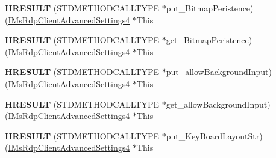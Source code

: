 \begin{DoxyCompactItemize}
\item 
\mbox{\label{struct_m_s_t_s_c_lib_1_1_i_ms_rdp_client_advanced_settings4_vtbl_a35eb2526465e976b9559883c106508df}} 
{\bfseries H\+R\+E\+S\+U\+LT} (S\+T\+D\+M\+E\+T\+H\+O\+D\+C\+A\+L\+L\+T\+Y\+PE $\ast$put\+\_\+\+Bitmap\+Peristence)(\hyperlink{interface_m_s_t_s_c_lib_1_1_i_ms_rdp_client_advanced_settings4}{I\+Ms\+Rdp\+Client\+Advanced\+Settings4} $\ast$This
\item 
\mbox{\label{struct_m_s_t_s_c_lib_1_1_i_ms_rdp_client_advanced_settings4_vtbl_a3e0f797f71f4f496c6a9f53a15f04e23}} 
{\bfseries H\+R\+E\+S\+U\+LT} (S\+T\+D\+M\+E\+T\+H\+O\+D\+C\+A\+L\+L\+T\+Y\+PE $\ast$get\+\_\+\+Bitmap\+Peristence)(\hyperlink{interface_m_s_t_s_c_lib_1_1_i_ms_rdp_client_advanced_settings4}{I\+Ms\+Rdp\+Client\+Advanced\+Settings4} $\ast$This
\item 
\mbox{\label{struct_m_s_t_s_c_lib_1_1_i_ms_rdp_client_advanced_settings4_vtbl_af2aeb35dd5fbeb96905ff35c6bba2b35}} 
{\bfseries H\+R\+E\+S\+U\+LT} (S\+T\+D\+M\+E\+T\+H\+O\+D\+C\+A\+L\+L\+T\+Y\+PE $\ast$put\+\_\+allow\+Background\+Input)(\hyperlink{interface_m_s_t_s_c_lib_1_1_i_ms_rdp_client_advanced_settings4}{I\+Ms\+Rdp\+Client\+Advanced\+Settings4} $\ast$This
\item 
\mbox{\label{struct_m_s_t_s_c_lib_1_1_i_ms_rdp_client_advanced_settings4_vtbl_a415a52a556a0c33b1b1a57cb479e2856}} 
{\bfseries H\+R\+E\+S\+U\+LT} (S\+T\+D\+M\+E\+T\+H\+O\+D\+C\+A\+L\+L\+T\+Y\+PE $\ast$get\+\_\+allow\+Background\+Input)(\hyperlink{interface_m_s_t_s_c_lib_1_1_i_ms_rdp_client_advanced_settings4}{I\+Ms\+Rdp\+Client\+Advanced\+Settings4} $\ast$This
\item 
\mbox{\label{struct_m_s_t_s_c_lib_1_1_i_ms_rdp_client_advanced_settings4_vtbl_ac54c58d7c364de91252ca7f014be5237}} 
{\bfseries H\+R\+E\+S\+U\+LT} (S\+T\+D\+M\+E\+T\+H\+O\+D\+C\+A\+L\+L\+T\+Y\+PE $\ast$put\+\_\+\+Key\+Board\+Layout\+Str)(\hyperlink{interface_m_s_t_s_c_lib_1_1_i_ms_rdp_client_advanced_settings4}{I\+Ms\+Rdp\+Client\+Advanced\+Settings4} $\ast$This
\item 

\end{DoxyCompactItemize}
